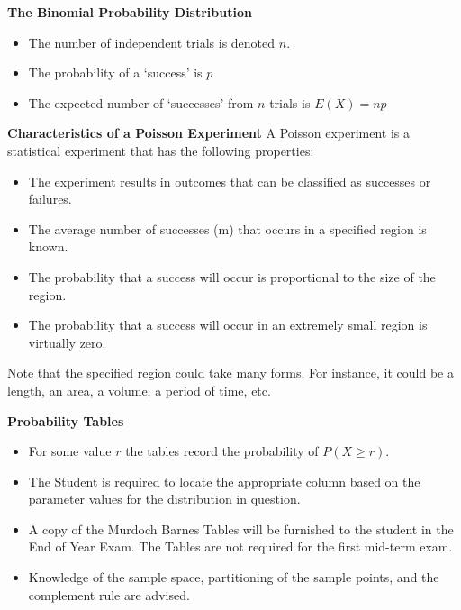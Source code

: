 \documentclass[]{report}
\begin{document}
{
\textbf{The Binomial Probability Distribution}
\begin{itemize}
\item  The number of independent trials is denoted $n$.
\item  The probability of a `success' is $p$
\item  The expected number of `successes' from $n$ trials is $E(X) = np$
\end{itemize}
}
{
\textbf{Characteristics of a Poisson Experiment}
A Poisson experiment is a statistical experiment that has the following properties:
\begin{itemize}
\item  The experiment results in outcomes that can be classified as successes or failures.
\item  The average number of successes (m) that occurs in a specified region is known.
\item  The probability that a success will occur is proportional to the size of the region.
\item  The probability that a success will occur in an extremely small region is virtually zero.
\end{itemize}
Note that the specified region could take many forms. For instance, it could be a length, an area, a volume, a period of time, etc.
}

{
\textbf{Probability Tables}
\begin{itemize}
\item  For some value $r$ the tables record the probability of $P(X \geq r)$.
\item  The Student is required to locate the appropriate column based on the parameter values for the distribution in question.
\item  A copy of the Murdoch Barnes Tables will be furnished to the student in the End of Year Exam. The Tables are not required for the first mid-term exam.
\item  Knowledge of the sample space, partitioning of the sample points, and the complement rule are advised.
\end{itemize}
}
\end{document}

